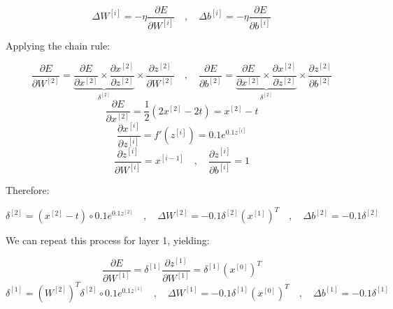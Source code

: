 \documentclass[12pt]{article}
\begin{document}
\begin{enumerate}[leftmargin=\labelsep]
          $$
              \Delta W^{[i]} = - \eta \frac{\partial E}{\partial W^{[i]}}
              \quad,\quad
              \Delta b^{[i]} = - \eta \frac{\partial E}{\partial b^{[i]}}
          $$

          Applying the chain rule:

          $$
              \frac{\partial E}{\partial W^{[2]}} =
              \underbrace{\frac{\partial E}{\partial x^{[2]}}
                  \times
                  \frac{\partial x^{[2]}}{\partial z^{[2]}}
              }_{\delta^{[2]}}
              \times
              \frac{\partial z^{[2]}}{\partial W^{[2]}}
              \quad,\quad
              \frac{\partial E}{\partial b^{[2]}} =
              \underbrace{\frac{\partial E}{\partial x^{[2]}}
                  \times
                  \frac{\partial x^{[2]}}{\partial z^{[2]}}
              }_{\delta^{[2]}}
              \times
              \frac{\partial z^{[2]}}{\partial b^{[2]}}
          $$
          $$
              \frac{\partial E}{\partial x^{[2]}}
              = \frac{1}{2} \left( 2x^{[2]} - 2t \right)
              = x^{[2]} - t
          $$
          $$
              \frac{\partial x^{[i]}}{\partial z^{[i]}} = f'\left(z^{[i]}\right) = 0.1 e^{0.1 z^{[i]}}
          $$
          $$
              \frac{\partial z^{[i]}}{\partial W^{[i]}} = x^{[i-1]}
              \quad,\quad
              \frac{\partial z^{[i]}}{\partial b^{[i]}} = 1
          $$

          Therefore:

          \begin{equation}\label{ex3-vars-layer-2}
              \delta^{[2]} = (x^{[2]} - t) \circ 0.1 e^{0.1 z^{[2]}}
              \quad,\quad
              \Delta W^{[2]} = - 0.1 \delta^{[2]} \left(x^{[1]}\right)^T
              \quad,\quad
              \Delta b^{[2]} = - 0.1 \delta^{[2]}
          \end{equation}

          We can repeat this process for layer 1, yielding:

          $$
              \frac{\partial E}{\partial W^{[1]}} = \delta^{[1]} \frac{\partial z^{[1]}}{\partial W^{[1]}}
              = \delta^{[1]} \left(x^{[0]}\right)^T
          $$
          \begin{equation}\label{ex3-vars-layer-1}
              \delta^{[1]} = \left(W^{[2]}\right)^T \delta^{[2]} \circ 0.1 e^{0.1 z^{[1]}}
              \quad,\quad
              \Delta W^{[1]} = - 0.1 \delta^{[1]} \left(x^{[0]}\right)^T
              \quad,\quad
              \Delta b^{[1]} = - 0.1 \delta^{[1]}
          \end{equation}


\end{enumerate}
\end{document}
